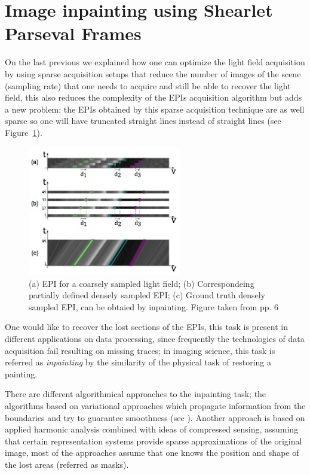 \section{Image inpainting using Shearlet Parseval Frames}
\label{sec:shearlet_parseval_inpainting}

On the last previous we explained how one can optimize the light field acquisition by using sparse acquisition setups that reduce the number of images of the scene (sampling rate) that one needs to acquire and still be able to recover the light field, this also reduces the complexity of the EPIs acquisition algorithm but adds a new problem; the EPIs obtained by this sparse acquisition technique are as well sparse so one will have truncated straight lines instead of straight lines (see Figure~\ref{fig:sparse_EPI}). 

\begin{figure}[h!]
\centering
\includegraphics[width=0.6\textwidth]{./Diagrams/sparse_EPI.jpg}
\caption{(a) EPI for a coarsely sampled light field; (b) Correspondeing partially defined densely sampled EPI; (c) Ground truth densely sampled EPI, can be obtaied by inpainting. Figure taken from \cite{LF-Shearlets} pp. 6}
\label{fig:sparse_EPI}
\end{figure}

One would like to recover the lost sections of the EPIs, this task is present in different applications on data processing, since frequently the technologies of data acquisition fail resulting on missing traces; in imaging science, this task is referred as \textit{inpainting} by the similarity of the physical task of restoring a painting. 

\bigskip

There are different algorithmical approaches to the inpainting task; the algorithms based on variational approaches which propagate information from the boundaries and try to guarantee smoothness (see \cite{Ballester}). Another approach is based on applied harmonic analysis combined with ideas of compressed sensing, assuming that certain representation systems provide sparse approximations of the original image, most of the approaches assume that one knows the position and shape of the lost areas (referred as masks).

